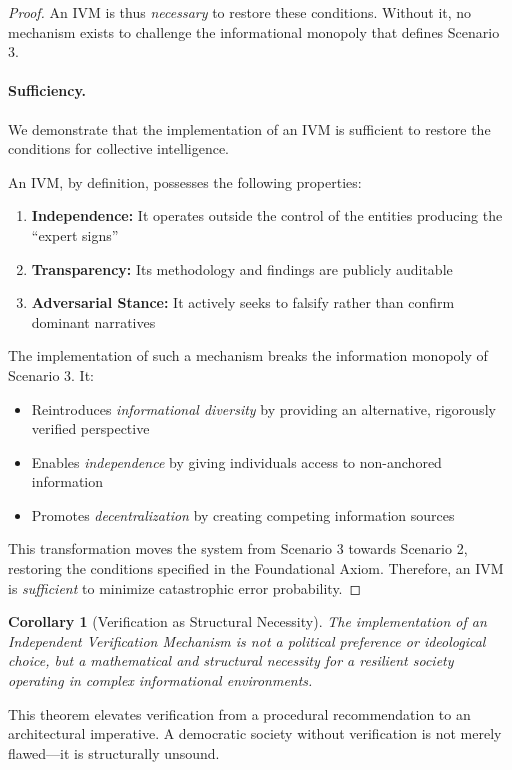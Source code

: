 \documentclass[11pt,a4paper]{article}
\newtheorem{corollary}{Corollary}[theorem]
\begin{document}
\begin{small}
\begin{proof}
An IVM is thus \textit{necessary} to restore these conditions. Without it, no mechanism exists to challenge the informational monopoly that defines Scenario 3.

\paragraph{Sufficiency.} We demonstrate that the implementation of an IVM is sufficient to restore the conditions for collective intelligence.

An IVM, by definition, possesses the following properties:
\begin{enumerate}
    \item \textbf{Independence:} It operates outside the control of the entities producing the ``expert signs''
    \item \textbf{Transparency:} Its methodology and findings are publicly auditable
    \item \textbf{Adversarial Stance:} It actively seeks to falsify rather than confirm dominant narratives
\end{enumerate}

The implementation of such a mechanism breaks the information monopoly of Scenario 3. It:
\begin{itemize}
    \item Reintroduces \textit{informational diversity} by providing an alternative, rigorously verified perspective
    \item Enables \textit{independence} by giving individuals access to non-anchored information
    \item Promotes \textit{decentralization} by creating competing information sources
\end{itemize}

This transformation moves the system from Scenario 3 towards Scenario 2, restoring the conditions specified in the Foundational Axiom. Therefore, an IVM is \textit{sufficient} to minimize catastrophic error probability.
\end{proof}

\begin{corollary}[Verification as Structural Necessity]
The implementation of an Independent Verification Mechanism is not a political preference or ideological choice, but a mathematical and structural necessity for a resilient society operating in complex informational environments.
\end{corollary}

This theorem elevates verification from a procedural recommendation to an architectural imperative. A democratic society without verification is not merely flawed---it is structurally unsound.


\end{small}
\end{document}
